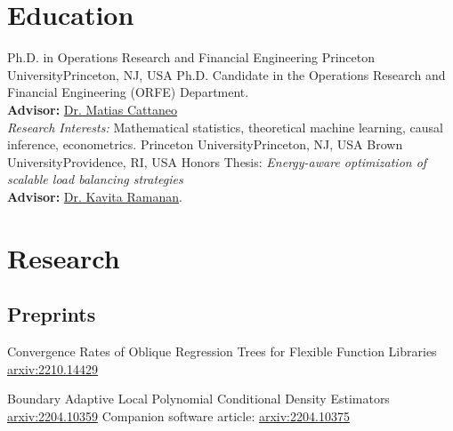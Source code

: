 \documentclass[10pt,a4paper,roman]{moderncv}        %
\begin{document}
\makecvtitle

\section{Education}
{Ph.D. in Operations Research and Financial Engineering}
{Princeton University}{Princeton, NJ, USA}{}
{Ph.D. Candidate in the Operations Research and Financial Engineering (ORFE) Department.\\
\textbf{Advisor: }\color{blue}\href{https://cattaneo.princeton.edu}{Dr. Matias Cattaneo}\color{black}\\
\textit{Research Interests:} Mathematical statistics, theoretical machine learning, causal inference, econometrics.}
{Princeton University}{Princeton, NJ, USA}{}{}
{Brown University}{Providence, RI, USA}{}{ Honors Thesis: \textit{Energy-aware optimization of scalable load balancing
    strategies}
  \\
  \textbf{Advisor: }
  \color{blue}\href{https://www.brown.edu/academics/applied-mathematics/faculty/kavita-ramanan/home}
  {Dr. Kavita Ramanan}\color{black}.}  %

\section{Research}
\subsection{Preprints}
{Convergence Rates of Oblique Regression Trees for Flexible Function Libraries}
{\color{blue}\href{https://arxiv.org/abs/2210.14429}{arxiv:2210.14429}\color{black}}{}
{}

{Boundary Adaptive Local Polynomial Conditional Density Estimators}
{\color{blue}\href{https://arxiv.org/abs/2204.10359}{arxiv:2204.10359}\color{black}}{}
{Companion software article: \color{blue}\href{https://arxiv.org/abs/2204.10375}{arxiv:2204.10375}\color{black}}
\end{document}
